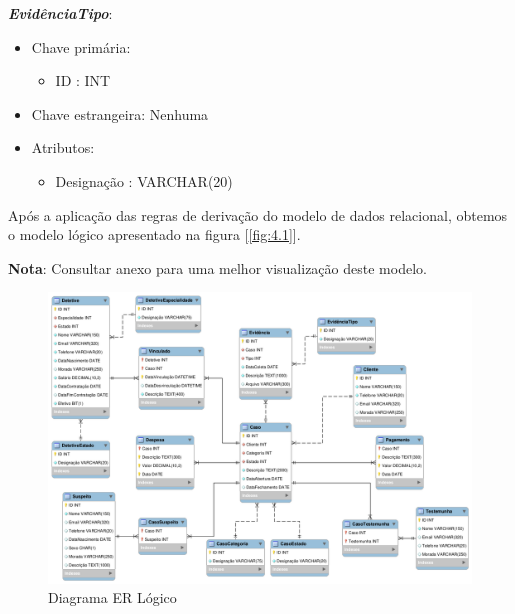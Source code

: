 \documentclass[a4paper,12pt]{scrreprt}
\begin{document}
        \vspace{0.5cm}
        
        \textbf{\textit{EvidênciaTipo}}:
        \begin{itemize}
            \item Chave primária:
                \begin{itemize}
                    \item ID : INT
                \end{itemize}
            \item Chave estrangeira: Nenhuma
            \item Atributos:
                \begin{itemize}
                    \item Designação : VARCHAR(20)
                \end{itemize}
        \end{itemize}

    \vspace{1cm}

    Após a aplicação das regras de derivação do modelo de dados relacional, obtemos o modelo lógico apresentado na figura [\ref{fig:4.1}].

    \textbf{Nota}: Consultar anexo \textit{} para uma melhor visualização deste modelo.

    \clearpage
    \begin{figure}[!ht]
        \centering
        \includegraphics[scale=0.70, angle=270]{images/modelo_logico/final.png}
        \caption{Diagrama ER Lógico}
        \label{fig:4.4}
    \end{figure}
\end{document}
